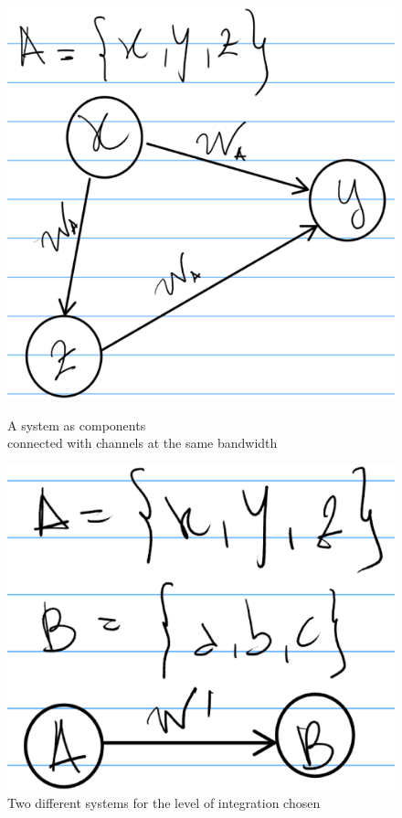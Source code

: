 \documentclass[14pt]{extarticle}
\begin{document}
\newpage
\vspace{0.5cm}

\begin{figure}[htbp]
\begin{minipage}[t]{0.45\linewidth}
    \includegraphics[width=\linewidth]{Fig__1_connected_elements.eps}
	\caption{A system as components\\ connected with channels at the same bandwidth}%
	\label{fig:fig1}
\end{minipage}%
    \hfill%
\begin{minipage}[t]{0.45\linewidth}
    \includegraphics[width=\linewidth]{Fig__2_connected_groups-2.eps}
    \caption{Two different systems for the level of integration chosen}%
    \label{fig:fig2}
\end{minipage} 
\end{figure}
\end{document}

